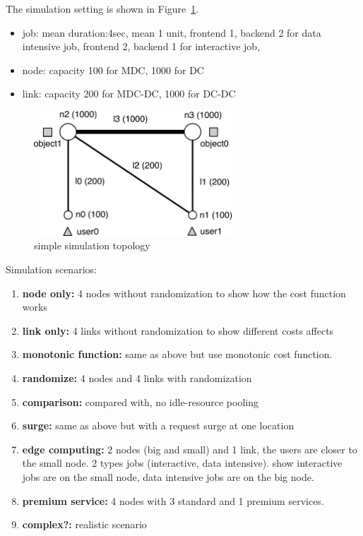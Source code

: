 
The simulation setting is shown in Figure~\ref{fig:topology-simple}.
\begin{itemize}
  \item		job: mean duration:4sec, mean 1 unit,
        frontend 1, backend 2 for data intensive job,
        frontend 2, backend 1 for interactive job,
  \item		node: capacity 100 for MDC, 1000 for DC
  \item		link: capacity 200 for MDC-DC, 1000 for DC-DC
\end{itemize}

\begin{figure}[htb]
  \begin{center}
    \includegraphics[width=7.5cm,clip]{topology-simple.pdf}
    \vspace{-2.0ex}
    \caption{simple simulation topology}
    \label{fig:topology-simple}
  \end{center}
\end{figure}

Simulation scenarios:
\begin{enumerate}
  \item	{\bf node only:} 4 nodes without randomization to show how the
        cost function works
  \item	{\bf link only:} 4 links without randomization to show
        different costs affects
  \item	{\bf monotonic function:} same as above but use monotonic cost
        function.
  \item	{\bf randomize:} 4 nodes and 4 links with randomization
  \item {\bf comparison:} compared with, no idle-resource pooling
  \item	{\bf surge:} same as above but with a request surge at one location
  \item	{\bf edge computing:} 2 nodes (big and small) and 1 link, the
    users are closer to the small node. 2 types jobs (interactive,
    data intensive).  show interactive jobs are on the small node,
    data intensive jobs are on the big node.
  \item {\bf premium service:} 4 nodes with 3 standard and 1 premium services.
  \item	{\bf complex?:} realistic scenario
\end{enumerate}
